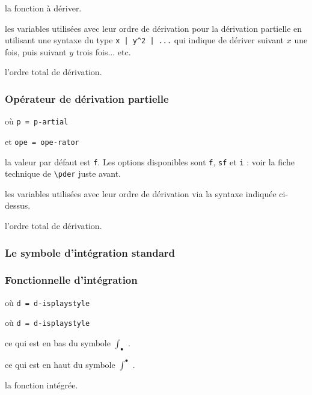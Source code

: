 \documentclass[12pt,a4paper]{article}
\newcommand\env[1]{\texttt{#1}}
\newcommand\macro[1]{\env{\textbackslash{}#1}}
\theoremstyle{definition}
\newcommand\extraspace{
	\vspace{0.25em}
}
\newcommand\mwhyprefix[2]{%
	\texttt{#1 = #1-#2}%
}
\begin{document}
 la fonction à dériver.

 les variables utilisées avec leur ordre de dérivation pour la dérivation partielle en utilisant une syntaxe du type \verb+x | y^2 | ...+ qui indique de dériver suivant $x$ une fois, puis suivant $y$ trois fois... etc.

 l'ordre total de dérivation.




\subsubsection{Opérateur de dérivation partielle}

 où \quad \mwhyprefix{p}{artial}
                              et \mwhyprefix{ope}{rator}

\IDoption{} la valeur par défaut est \verb+f+. Les options disponibles sont \verb+f+, \verb+sf+ et \verb+i+ : voir la fiche technique de \macro{pder} juste avant.

 les variables utilisées avec leur ordre de dérivation via la syntaxe indiquée ci-dessus.

 l'ordre total de dérivation.
\subsubsection{Le symbole d'intégration standard}






\subsubsection{Fonctionnelle d'intégration}



\extraspace

   où \quad \mwhyprefix{d}{isplaystyle}

  où \quad \mwhyprefix{d}{isplaystyle}

 ce qui est en bas du symbole $\int_{\bullet}$ .

 ce qui est en haut du symbole $\int^{\bullet}$ .

 la fonction intégrée.
\end{document}
